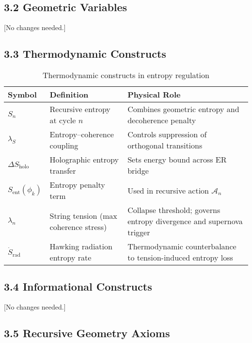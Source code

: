 \subsection{3.2 Geometric Variables}
\label{subsec:geometry}

[No changes needed.]

\subsection{3.3 Thermodynamic Constructs}
\label{subsec:thermodynamic}

\begin{table}[H]
\centering
\begin{tabular}{>{\raggedright}p{3cm}>{\raggedright}p{7cm}>{\raggedright\arraybackslash}p{5cm}}
\toprule
\textbf{Symbol} & \textbf{Definition} & \textbf{Physical Role} \\
\midrule
\( S_n \) & Recursive entropy at cycle \( n \) & Combines geometric entropy and decoherence penalty \\
\addlinespace
\( \lambda_S \) & Entropy--coherence coupling & Controls suppression of orthogonal transitions \\
\addlinespace
\( \Delta S_{\text{holo}} \) & Holographic entropy transfer & Sets energy bound across ER bridge \\
\addlinespace
\( S_{\text{ent}}(\phi_k) \) & Entropy penalty term & Used in recursive action \(\mathcal{A}_n\) \\
\addlinespace
\( \lambda_n \) & String tension (max coherence stress) & Collapse threshold; governs entropy divergence and supernova trigger \\
\addlinespace
\( \dot{S}_{\text{rad}} \) & Hawking radiation entropy rate & Thermodynamic counterbalance to tension-induced entropy loss \\
\bottomrule
\end{tabular}
\caption{Thermodynamic constructs in entropy regulation}
\end{table}

\subsection{3.4 Informational Constructs}
\label{subsec:info-constructs}

[No changes needed.]

\subsection{3.5 Recursive Geometry Axioms}
\label{subsec:axioms}

